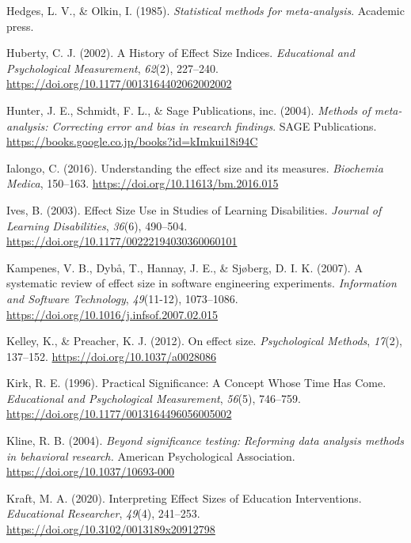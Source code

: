 \documentclass[
  ja=standard, xelatex, base=12pt]{bxjsreport}
\newlength{\cslhangindent}
\newlength{\cslentryspacingunit} %
\newenvironment{CSLReferences}[2] %
 {%
  \setlength{\parindent}{0pt}
  \ifodd #1
  \let\oldpar\par
  \def\par{\hangindent=\cslhangindent\oldpar}
  \fi
  \setlength{\parskip}{#2\cslentryspacingunit}
 }%
 {}
\begin{document}
\begin{CSLReferences}{1}{0}
\leavevmode{}%
Hedges, L. V., \& Olkin, I. (1985). \emph{Statistical methods for meta-analysis}. Academic press.

\leavevmode{}%
Huberty, C. J. (2002). A History of Effect Size Indices. \emph{Educational and Psychological Measurement}, \emph{62}(2), 227--240. \url{https://doi.org/10.1177/0013164402062002002}

\leavevmode{}%
Hunter, J. E., Schmidt, F. L., \& Sage Publications, inc. (2004). \emph{Methods of meta-analysis: Correcting error and bias in research findings}. SAGE Publications. \url{https://books.google.co.jp/books?id=kImkui18i94C}

\leavevmode{}%
Ialongo, C. (2016). Understanding the effect size and its measures. \emph{Biochemia Medica}, 150--163. \url{https://doi.org/10.11613/bm.2016.015}

\leavevmode{}%
Ives, B. (2003). Effect Size Use in Studies of Learning Disabilities. \emph{Journal of Learning Disabilities}, \emph{36}(6), 490--504. \url{https://doi.org/10.1177/00222194030360060101}

\leavevmode{}%
Kampenes, V. B., Dybå, T., Hannay, J. E., \& Sjøberg, D. I. K. (2007). A systematic review of effect size in software engineering experiments. \emph{Information and Software Technology}, \emph{49}(11-12), 1073--1086. \url{https://doi.org/10.1016/j.infsof.2007.02.015}

\leavevmode{}%
Kelley, K., \& Preacher, K. J. (2012). On effect size. \emph{Psychological Methods}, \emph{17}(2), 137--152. \url{https://doi.org/10.1037/a0028086}

\leavevmode{}%
Kirk, R. E. (1996). Practical Significance: A Concept Whose Time Has Come. \emph{Educational and Psychological Measurement}, \emph{56}(5), 746--759. \url{https://doi.org/10.1177/0013164496056005002}

\leavevmode{}%
Kline, R. B. (2004). \emph{Beyond significance testing: Reforming data analysis methods in behavioral research.} American Psychological Association. \url{https://doi.org/10.1037/10693-000}

\leavevmode{}%
Kraft, M. A. (2020). Interpreting Effect Sizes of Education Interventions. \emph{Educational Researcher}, \emph{49}(4), 241--253. \url{https://doi.org/10.3102/0013189x20912798}


\end{CSLReferences}
\end{document}
